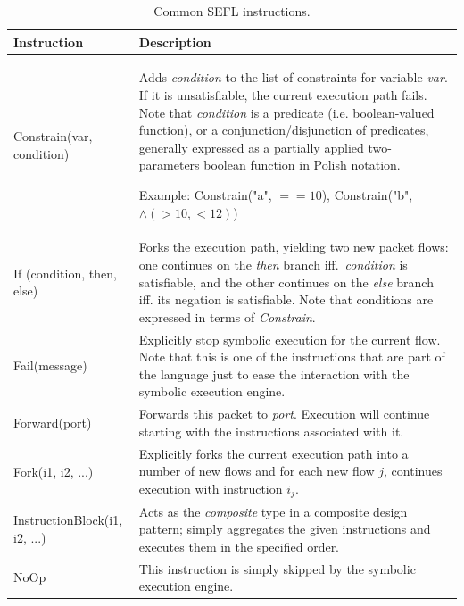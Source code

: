\begin{table}
  \centering
  \begin{tabular}{ | l | p{10cm} |}
    \hline
    \textbf{Instruction} & \textbf{Description} \\ \hline

    Constrain(var, condition) & Adds \emph{condition} to the list of
    constraints for variable \emph{var}.  If it is unsatisfiable, the current
    execution path fails. Note that \emph{condition} is a predicate (i.e.
    boolean-valued function), or a conjunction/disjunction of predicates,
    generally expressed as a partially applied two-parameters boolean function
    in Polish notation.

    Example: Constrain("a", $== 10$), Constrain("b", $\land(> 10, < 12)$)
    \\ \hline

    If (condition, then, else) & Forks the execution path, yielding two new
    packet flows: one continues on the \emph{then} branch iff.\
    \emph{condition} is satisfiable, and the other continues on the \emph{else}
    branch iff. its negation is satisfiable.  Note that conditions are
    expressed in terms of \emph{Constrain}.
    \\ \hline

    Fail(message) & Explicitly stop symbolic execution for the current flow.
    Note that this is one of the instructions that are part of the language
    just to ease the interaction with the symbolic execution engine.
    \\ \hline

    Forward(port) & Forwards this packet to \emph{port}.  Execution will
    continue starting with the instructions associated with it.
    \\ \hline

    Fork(i1, i2, ...) & Explicitly forks the current execution path into a number of new
    flows and for each new flow $j$, continues execution with instruction
    $i_{j}$.
    \\ \hline

    InstructionBlock(i1, i2, ...) & Acts as the \emph{composite} type in a
    composite design pattern; simply aggregates the given instructions and
    executes them in the specified order.
    \\ \hline

    NoOp & This instruction is simply skipped by the symbolic execution engine.
    \\ \hline
  \end{tabular}
  \caption{Common SEFL instructions.}
  \label{tab:sefl-instr}
\end{table}

